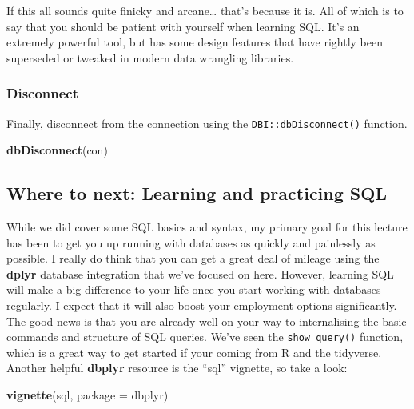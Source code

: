 \documentclass[
]{article}
\newenvironment{Shaded}{\begin{snugshade}}{\end{snugshade}}
\newcommand{\AttributeTok}[1]{\textcolor[rgb]{0.13,0.29,0.53}{#1}}
\newcommand{\FunctionTok}[1]{\textcolor[rgb]{0.13,0.29,0.53}{\textbf{#1}}}
\newcommand{\NormalTok}[1]{#1}
\newcommand{\StringTok}[1]{\textcolor[rgb]{0.31,0.60,0.02}{#1}}
\begin{document}
If this all sounds quite finicky and arcane\ldots{} that's because it
is. All of which is to say that you should be patient with yourself when
learning SQL. It's an extremely powerful tool, but has some design
features that have rightly been superseded or tweaked in modern data
wrangling libraries.

\hypertarget{disconnect}{%
\subsubsection{Disconnect}\label{disconnect}}

Finally, disconnect from the connection using the
\texttt{DBI::dbDisconnect()} function.

\begin{Shaded}
\begin{Highlighting}[]
\FunctionTok{dbDisconnect}\NormalTok{(con)}
\end{Highlighting}
\end{Shaded}

\hypertarget{where-to-next-learning-and-practicing-sql}{%
\subsection{Where to next: Learning and practicing
SQL}\label{where-to-next-learning-and-practicing-sql}}

While we did cover some SQL basics and syntax, my primary goal for this
lecture has been to get you up running with databases as quickly and
painlessly as possible. I really do think that you can get a great deal
of mileage using the \textbf{dplyr} database integration that we've
focused on here. However, learning SQL will make a big difference to
your life once you start working with databases regularly. I expect that
it will also boost your employment options significantly. The good news
is that you are already well on your way to internalising the basic
commands and structure of SQL queries. We've seen the
\texttt{show\_query()} function, which is a great way to get started if
your coming from R and the tidyverse. Another helpful \textbf{dbplyr}
resource is the ``sql'' vignette, so take a look:

\begin{Shaded}
\begin{Highlighting}[]
\FunctionTok{vignette}\NormalTok{(}\StringTok{\textquotesingle{}sql\textquotesingle{}}\NormalTok{, }\AttributeTok{package =} \StringTok{\textquotesingle{}dbplyr\textquotesingle{}}\NormalTok{)}
\end{Highlighting}
\end{Shaded}
\end{document}
